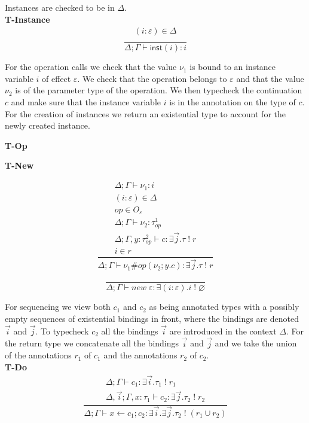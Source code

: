 \documentclass[12pt]{article}
\newcommand\eff[0]{\varepsilon}
\newcommand\Op[0]{O}
\newcommand\op[0]{op}
\newcommand\pty[1]{\ty^1_{#1}}
\newcommand\rty[1]{\ty^2_{#1}}
\newcommand\ty[0]{\tau}
\newcommand\aty[2]{#1 \; ! \; #2}
\newcommand\texists[3]{\exists(#1:#2) . #3}
\newcommand\texistss[2]{\exists \overrightarrow{#1} . #2}
\newcommand\val[0]{\nu}
\newcommand\vinst[1]{\mathsf{inst}(#1)}
\newcommand\comp[0]{c}
\newcommand\cdo[3]{#1 \leftarrow #2 ; #3}
\newcommand\copi[5]{#1 \# #2(#3 ; #4 . #5)}
\newcommand\cnew[1]{\textit{new} \; #1}
\begin{document}
\newpage
Instances are checked to be in $\Delta$.\\
\textbf{T-Instance}
\[\frac{
	\begin{array}{l}
	(i:\eff)\in\Delta \\
	\end{array}
}{
	\Delta;\Gamma \vdash \vinst{i} : i
}\]



For the operation calls we check that the value $\val_1$ is bound to an instance variable $i$ of effect $\eff$.
We check that the operation belongs to $\eff$ and that the value $\val_2$ is of the parameter type of the operation.
We then typecheck the continuation $c$ and make sure that the instance variable $i$ is in the annotation on the type of $c$. \\
For the creation of instances we return an existential type to account for the newly created instance. \\
\begin{minipage}{0.5\textwidth}
\textbf{T-Op}
\end{minipage}
\begin{minipage}{0.5\textwidth}
\textbf{T-New}
\end{minipage}
\begin{minipage}{0.5\textwidth}
\[\frac{
	\begin{array}{l}
	\Delta;\Gamma \vdash \val_1 : i \\
	(i:\eff)\in\Delta \\
	\op \in \Op_\eff\\
	\Delta;\Gamma \vdash \val_2 : \pty{\op} \\
	\Delta;\Gamma , y : \rty{\op} \vdash \comp : \texistss{j}{\aty{\ty}{r}} \\
	i \in r
	\end{array}
}{
	\Delta;\Gamma \vdash \copi{\val_1}{\op}{\val_2}{y}{\comp} : \texistss{j}{\aty{\ty}{r}}
}\]
\vspace{10pt}
\end{minipage}
\begin{minipage}{0.5\textwidth}
\[\frac{
}{
	\Delta;\Gamma \vdash \cnew{\eff} : \texists{i}{\eff}{\aty{i}{\varnothing}}
}\]
\vspace{10pt}
\end{minipage}

For sequencing we view both $c_1$ and $c_2$ as being annotated types with a possibly empty sequences of existential bindings in front, where the bindings are denoted $\overrightarrow{i}$ and $\overrightarrow{j}$.
To typecheck $c_2$ all the bindings $\overrightarrow{i}$ are introduced in the context $\Delta$. For the return type we concatenate all the bindings $\overrightarrow{i}$ and $\overrightarrow{j}$ and we take the union of the annotations $r_1$ of $c_1$ and the annotations $r_2$ of $c_2$. \\
\textbf{T-Do}
\[\frac{
	\begin{array}{l}
	\Delta;\Gamma \vdash c_1 : \texistss{i}{\aty{\ty_1}{r_1}} \\
	\Delta,\overrightarrow{i} ; \Gamma, x : \ty_1 \vdash c_2 : \texistss{j}{\aty{\ty_2}{r_2}}
	\end{array}
}{
	\Delta;\Gamma \vdash \cdo{x}{c_1}{c_2} : \texistss{i}{\texistss{j}{\aty{\ty_2}{(r_1 \cup r_2)}}}
}\]
\end{document}

